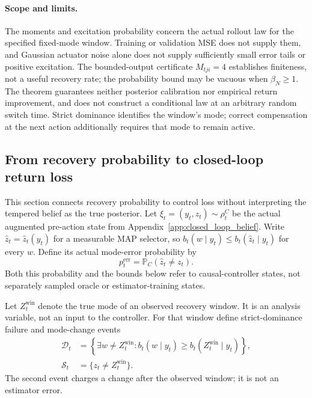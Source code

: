\paragraph{Scope and limits.}
The moments and excitation probability concern the actual rollout law for the specified fixed-mode window.
Training or validation MSE does not supply them, and Gaussian actuator noise alone does not supply sufficiently small error tails or positive excitation.
The bounded-output certificate $M_{tji}=4$ establishes finiteness, not a useful recovery rate; the probability bound may be vacuous when $\beta_N\ge1$.
The theorem guarantees neither posterior calibration nor empirical return improvement, and does not construct a conditional law at an arbitrary random switch time.
Strict dominance identifies the window's mode; correct compensation at the next action additionally requires that mode to remain active.

\subsection{From recovery probability to closed-loop return loss}
\label{app:recovery_return}

This section connects recovery probability to control loss without interpreting the tempered belief as the true posterior.
Let $\xi_t=(y_t,z_t)\sim\rho_t^C$ be the actual augmented pre-action state from Appendix~\ref{app:closed_loop_belief}.
Write $\hat z_t=\hat z_t(y_t)$ for a measurable MAP selector, so $b_t(w\mid y_t)\le b_t(\hat z_t\mid y_t)$ for every $w$.
Define its actual mode-error probability by
\begin{equation}
 p_t^{\mathrm{err}}=\mathbb P_C(\hat z_t\ne z_t).
 \label{eq:actual_mode_error_probability}
\end{equation}
Both this probability and the bounds below refer to causal-controller states, not separately sampled oracle or estimator-training states.

Let $Z_t^{\mathrm{win}}$ denote the true mode of an observed recovery window.
It is an analysis variable, not an input to the controller.
For that window define strict-dominance failure and mode-change events
\begin{align}
 \mathcal D_t&=\left\{\exists w\ne Z_t^{\mathrm{win}}:
 b_t(w\mid y_t)\ge b_t(Z_t^{\mathrm{win}}\mid y_t)\right\},\\
 \mathcal S_t&=\{z_t\ne Z_t^{\mathrm{win}}\}.
 \label{eq:post_window_mode_change}
\end{align}
The second event charges a change after the observed window; it is not an estimator error.

